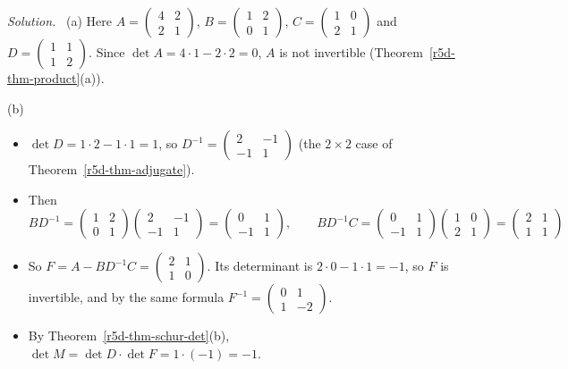 \documentclass[12pt]{article}
\theoremstyle{definition}
\newenvironment{solution}{\par\noindent\textit{Solution.}\ }{\par\smallskip}
\begin{document}
\begin{solution}
(a) Here \(A=\left(\begin{smallmatrix}4&2\\2&1\end{smallmatrix}\right)\),
\(B=\left(\begin{smallmatrix}1&2\\0&1\end{smallmatrix}\right)\),
\(C=\left(\begin{smallmatrix}1&0\\2&1\end{smallmatrix}\right)\) and
\(D=\left(\begin{smallmatrix}1&1\\1&2\end{smallmatrix}\right)\). Since \(\det A=4\cdot1-2\cdot2=0\), \(A\) is not
invertible (Theorem~\ref{r5d-thm-product}(a)).

(b)
\begin{itemize}
\item \(\det D=1\cdot2-1\cdot1=1\), so \(D^{-1}=\left(\begin{smallmatrix}2&-1\\-1&1\end{smallmatrix}\right)\) (the
\(2\times2\) case of Theorem~\ref{r5d-thm-adjugate}).
\item Then
\[
BD^{-1}=\begin{pmatrix}1&2\\0&1\end{pmatrix}\begin{pmatrix}2&-1\\-1&1\end{pmatrix}=\begin{pmatrix}0&1\\-1&1\end{pmatrix},\qquad
BD^{-1}C=\begin{pmatrix}0&1\\-1&1\end{pmatrix}\begin{pmatrix}1&0\\2&1\end{pmatrix}=\begin{pmatrix}2&1\\1&1\end{pmatrix}
\]
\item So \(F=A-BD^{-1}C=\left(\begin{smallmatrix}2&1\\1&0\end{smallmatrix}\right)\). Its determinant is
\(2\cdot0-1\cdot1=-1\), so \(F\) is invertible, and by the same formula
\(F^{-1}=\left(\begin{smallmatrix}0&1\\1&-2\end{smallmatrix}\right)\).
\item By Theorem~\ref{r5d-thm-schur-det}(b), \(\det M=\det D\cdot\det F=1\cdot(-1)=-1\).
\end{itemize}


\end{solution}
\end{document}
